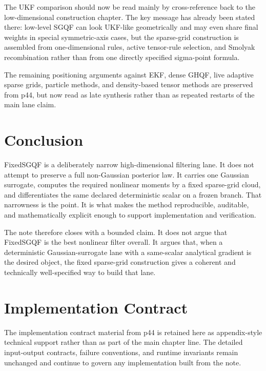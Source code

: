 \documentclass[11pt]{article}
\numberwithin{equation}{section}
\begin{document}
The UKF comparison should now be read mainly by cross-reference back to the
low-dimensional construction chapter.  The key message has already been stated
there: low-level SGQF can look UKF-like geometrically and may even share final
weights in special symmetric-axis cases, but the sparse-grid construction is
assembled from one-dimensional rules, active tensor-rule selection, and Smolyak
recombination rather than from one directly specified sigma-point formula.

The remaining positioning arguments against EKF, dense GHQF, live adaptive sparse
grids, particle methods, and density-based tensor methods are preserved from p44,
but now read as late synthesis rather than as repeated restarts of the main lane
claim.

\section{Conclusion}
\label{sec:p31-conclusion}

FixedSGQF is a deliberately narrow high-dimensional filtering lane.  It does not
attempt to preserve a full non-Gaussian posterior law.  It carries one Gaussian
surrogate, computes the required nonlinear moments by a fixed sparse-grid cloud,
and differentiates the same declared deterministic scalar on a frozen branch.
That narrowness is the point.  It is what makes the method reproducible,
auditable, and mathematically explicit enough to support implementation and
verification.

The note therefore closes with a bounded claim.  It does not argue that FixedSGQF
is the best nonlinear filter overall.  It argues that, when a deterministic
Gaussian-surrogate lane with a same-scalar analytical gradient is the desired
object, the fixed sparse-grid construction gives a coherent and technically
well-specified way to build that lane.

\appendix

\section{Implementation Contract}
\label{sec:p31-implementation-contract}

The implementation contract material from p44 is retained here as appendix-style
technical support rather than as part of the main chapter line.  The detailed
input-output contracts, failure conventions, and runtime invariants remain
unchanged and continue to govern any implementation built from the note.
\end{document}
